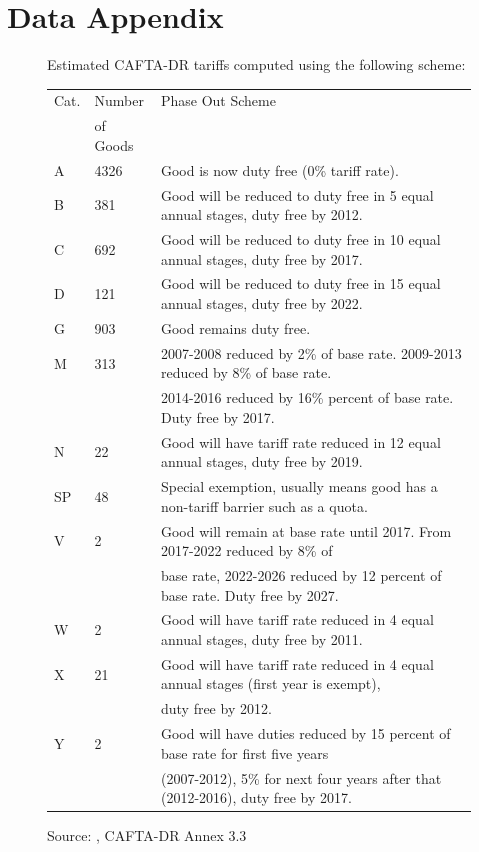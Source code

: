 \documentclass[12pt]{article}
\begin{document}

\newpage
\section{Data Appendix}
\label{sec:Appendix}

\begin{figure}[H]
\begin{center}
Estimated CAFTA-DR tariffs computed using the following scheme:
\begin{tabular}{lll}
\hline Cat. & Number & Phase Out Scheme \\
& of Goods & \\
\hline
A &4326&Good is now duty free (0\% tariff rate).\\
B & 381&Good will be reduced to duty free in 5 equal annual stages, duty free by 2012.\\
C & 692&Good will be reduced to duty free in 10 equal annual stages, duty free by 2017.\\
D & 121&Good will be reduced to duty free in 15 equal annual stages, duty free by 2022.\\
G & 903&Good remains duty free.\\
M & 313& 2007-2008 reduced by 2\% of base rate. 2009-2013 reduced by 8\% of base rate. \\
& & 2014-2016 reduced by 16\% percent of base rate. Duty free by 2017.\\
N & 22 & Good will have tariff rate reduced in 12 equal annual stages, duty free by 2019.\\
SP& 48 & Special exemption, usually means good has a non-tariff barrier such as a quota.\\
V &  2 & Good will remain at base rate until 2017. From 2017-2022 reduced by 8\% of\\
& & base rate, 2022-2026 reduced by 12 percent of base rate. Duty free by 2027.\\
W &  2 & Good will have tariff rate reduced in 4 equal annual stages, duty free by 2011.\\
X & 21 & Good will have tariff rate reduced in 4 equal annual stages (first year is exempt),\\ 
& & duty free by 2012. \\
Y & 2  & Good will have duties reduced by 15 percent of base rate for first five years\\
& & (2007-2012), 5\% for next four years after that (2012-2016), duty free by 2017.\\
\end{tabular}
\caption{\label{fig:Appendix1}}
Source: \citet{ustraderep}, CAFTA-DR Annex 3.3
\end{center}
\end{figure}
\end{document}
